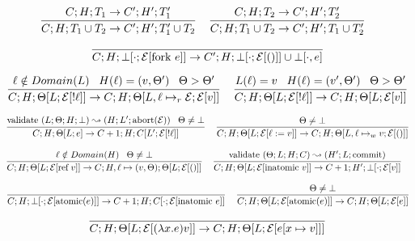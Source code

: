 \documentclass[9pt]{article}
\newcommand{\eval}[1]{\mathcal{E}[#1]}
\newcommand{\ctxt}[0]{\mathcal{E}}
\newcommand{\loc}[0]{\ell}
\newcommand{\atomic}[1]{\text{atomic}(#1)}
\newcommand{\alloc}[1]{\text{ref} \; #1}
\newcommand{\commit}[0]{\text{commit}}
\newcommand{\abort}[1]{\text{abort}(#1)}
\newcommand{\fork}[1]{\text{fork } #1}
\newcommand{\inatomic}[1]{\text{inatomic } #1}
\newcommand{\validate}[1]{\text{validate }(#1)}
\begin{document}
\[%
\infer[]{C; H; T_1 \cup T_2 \rightarrow C'; H'; T_1' \cup T_2}{C; H; T_1 \rightarrow C'; H'; T_1'} \;\;\;
\infer[]{C; H; T_1 \cup T_2 \rightarrow C'; H'; T_1 \cup T_2'}{C; H; T_2 \rightarrow C'; H'; T_2'} \;\;\; 
\]

\[%
\infer[]{C; H; \bot[\cdot; \eval{\fork{e}}] \rightarrow C'; H; \bot[\cdot; \eval{()}] \cup \bot[\cdot, e]}{}
\]

\[%
\infer[]{C; H; \Theta[L; \eval{!\loc}] \rightarrow C; H; \Theta[L, \loc \mapsto_r \ctxt; \eval{v}]}{\loc \notin Domain(L) \;\;\; H(\loc) = (v, \Theta') \;\;\; \Theta > \Theta'}  \;\;\;
\infer[]{C; H; \Theta[L; \eval{!\loc}] \rightarrow C; H; \Theta[L; \eval{v}]}{L(\loc) = v \;\;\; H(\loc) = (v', \Theta') \;\;\; \Theta > \Theta'} 
\]

\[%
\infer[]{C; H; \Theta[L; e] \rightarrow C+1; H; C[L'; \ctxt[!\loc]]}{\validate{L; \Theta; H; \bot} \leadsto (H; L'; \abort{\ctxt}) \;\;\; \Theta \neq \bot} \;\;\;
\infer[]{C; H; \Theta[L; \eval{\loc := v}] \rightarrow C; H; \Theta[L, \loc \mapsto_w v; \eval{()}]}{\Theta \neq \bot} 
\]

\[%
\infer[]{C; H; \Theta[L; \eval{\alloc{v}}] \rightarrow C; H, \loc \mapsto (v, \Theta); \Theta[L;  \eval{()}]}{\loc \notin Domain(H) \;\;\; \Theta \neq \bot} \;\;\;
\infer[]{C; H; \Theta[L; \eval{\inatomic{v}}] \rightarrow C+1; H'; \bot[\cdot; \eval{v}]}{\validate{\Theta; L; H; C} \leadsto (H'; L; \commit)} \;\;\;
\]

\[
\infer[]{C; H; \bot[\cdot; \eval{\atomic{e}}] \rightarrow C+1; H; C[\cdot; \eval{\inatomic{e}}]}{} \;\;\;
\infer[]{C; H; \Theta[L; \eval{\atomic{e}}] \rightarrow C; H; \Theta[L; \eval{e}]}{\Theta \neq \bot}
\]

\[
\infer[]{C; H; \Theta[L; \eval{(\lambda x. e) v}] \rightarrow C; H; \Theta[L; \eval{e[x\mapsto v]}]}{}
\]

\endgroup
\end{document}
